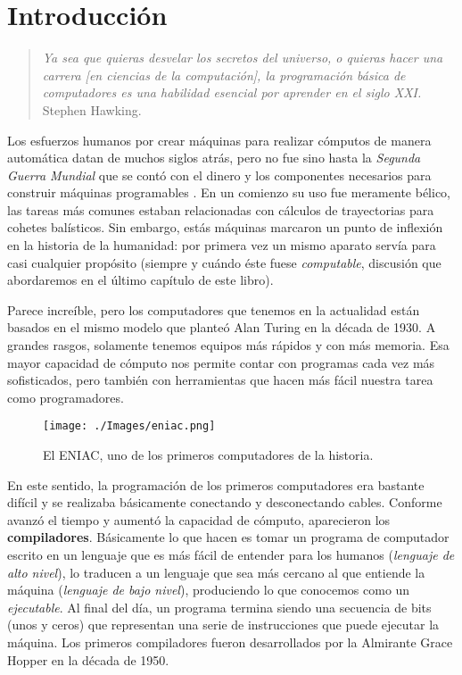 \chapter{Introducción}

\begin{quote}
\emph{Ya sea que quieras desvelar los secretos del universo, o quieras hacer una carrera [en ciencias de la computación], la programación básica de computadores es una habilidad esencial por aprender en el siglo XXI.} \\
Stephen Hawking.
\end{quote}

Los esfuerzos humanos por crear máquinas para realizar cómputos de manera automática datan de muchos siglos atrás, pero no fue sino hasta la \emph{Segunda Guerra Mundial} que se contó con el dinero y los componentes necesarios para construir máquinas programables \cite[p.~108]{evansIntro}. En un comienzo su uso fue meramente bélico, las tareas más comunes estaban relacionadas con cálculos de trayectorias para cohetes balísticos. Sin embargo, estás máquinas marcaron un punto de inflexión en la historia de la humanidad: por primera vez un mismo aparato servía para casi cualquier propósito (siempre y cuándo éste fuese \emph{computable}, discusión que abordaremos en el último capítulo de este libro).

Parece increíble, pero los computadores que tenemos en la actualidad están basados en el mismo modelo que planteó Alan Turing en la década de 1930. A grandes rasgos, solamente tenemos equipos más rápidos y con más memoria. Esa mayor capacidad de cómputo nos permite contar con programas cada vez más sofisticados, pero también con herramientas que hacen más fácil nuestra tarea como programadores.
 \newpage

\begin{wrapfigure}{r}{0.5\textwidth}
	\begin{center}
	\texttt{[image: ./Images/eniac.png]}
	\end{center}	
	\caption{El ENIAC, uno de los primeros computadores de la historia.}
\end{wrapfigure}

En este sentido, la programación de los primeros computadores era bastante difícil y se realizaba básicamente conectando y desconectando cables. Conforme avanzó el tiempo y aumentó la capacidad de cómputo, aparecieron los \textbf{compiladores}. Básicamente lo que hacen es tomar un programa de computador escrito en un lenguaje que es más fácil de entender para los humanos (\emph{lenguaje de alto nivel}), lo traducen a un lenguaje que sea más cercano al que entiende la máquina (\emph{lenguaje de bajo nivel}), produciendo lo que conocemos como un \emph{ejecutable}. Al final del día, un programa termina siendo una secuencia de bits (unos y ceros) que representan una serie de instrucciones que puede ejecutar la máquina. Los primeros compiladores fueron desarrollados por la Almirante Grace Hopper en la década de 1950.

